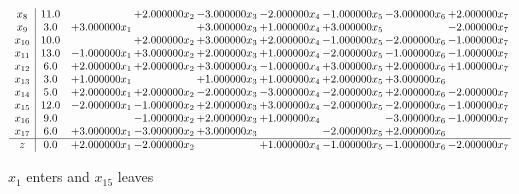 \documentclass[10pt]{article}
\begin{document}
\[\begin{array}{c| c c@{\hskip 2pt} c@{\hskip 2pt} c@{\hskip 2pt} c@{\hskip 2pt} c@{\hskip 2pt} c@{\hskip 2pt} c@{\hskip 2pt} }
 x_{8}   &  11.0  &   & + 2.000000 x_{2} & -3.000000 x_{3} & -2.000000 x_{4} & -1.000000 x_{5} & -3.000000 x_{6} & + 2.000000 x_{7}\\
 x_{9}   &  3.0 & + 3.000000 x_{1} &   & + 3.000000 x_{3} & + 1.000000 x_{4} & + 3.000000 x_{5} &   & -2.000000 x_{7}\\
 x_{10}   &  10.0  &   & + 2.000000 x_{2} & + 3.000000 x_{3} & + 2.000000 x_{4} & -1.000000 x_{5} & -2.000000 x_{6} & -1.000000 x_{7}\\
 x_{11}   &  13.0 & -1.000000 x_{1} & + 3.000000 x_{2} & + 2.000000 x_{3} & + 1.000000 x_{4} & -2.000000 x_{5} & -1.000000 x_{6} & -1.000000 x_{7}\\
 x_{12}   &  6.0 & + 2.000000 x_{1} & + 2.000000 x_{2} & + 3.000000 x_{3} & -1.000000 x_{4} & + 3.000000 x_{5} & + 2.000000 x_{6} & + 1.000000 x_{7}\\
 x_{13}   &  3.0 & + 1.000000 x_{1} &   & + 1.000000 x_{3} & + 1.000000 x_{4} & + 2.000000 x_{5} & + 3.000000 x_{6} &   \\
 x_{14}   &  5.0 & + 2.000000 x_{1} & + 2.000000 x_{2} & -2.000000 x_{3} & -3.000000 x_{4} & -2.000000 x_{5} & + 2.000000 x_{6} & -2.000000 x_{7}\\
 x_{15}   &  12.0 & -2.000000 x_{1} & -1.000000 x_{2} & + 2.000000 x_{3} & + 3.000000 x_{4} & -2.000000 x_{5} & -2.000000 x_{6} & -1.000000 x_{7}\\
 x_{16}   &  9.0  &   & -1.000000 x_{2} & + 2.000000 x_{3} & + 1.000000 x_{4} &   & -3.000000 x_{6} & -1.000000 x_{7}\\
 x_{17}   &  6.0 & + 3.000000 x_{1} & -3.000000 x_{2} & + 3.000000 x_{3} &   & -2.000000 x_{5} & + 2.000000 x_{6} &   \\
\hline
z    &  0.0 & + 2.000000 x_{1} & -2.000000 x_{2} &   & + 1.000000 x_{4} & -1.000000 x_{5} & -1.000000 x_{6} & -2.000000 x_{7}\\
\end{array}\]


 $ x_{1} $ enters and $ x_{15} $ leaves 
\end{document}
